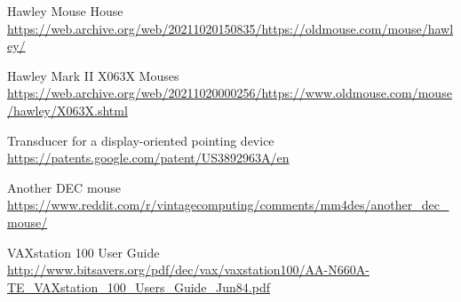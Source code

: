 \documentclass[11pt, a4paper]{article}
\begin{document}
\begin{thebibliography}{9}
 Hawley Mouse House \url{https://web.archive.org/web/20211020150835/https://oldmouse.com/mouse/hawley/}

 Hawley Mark II X063X Mouses \url{https://web.archive.org/web/20211020000256/https://www.oldmouse.com/mouse/hawley/X063X.shtml}

 Transducer for a display-oriented pointing device \url{https://patents.google.com/patent/US3892963A/en}

 Another DEC mouse \url{https://www.reddit.com/r/vintagecomputing/comments/mm4des/another_dec_mouse/}

 VAXstation 100 User Guide \url{http://www.bitsavers.org/pdf/dec/vax/vaxstation100/AA-N660A-TE_VAXstation_100_Users_Guide_Jun84.pdf}
\end{thebibliography}
\end{document}
